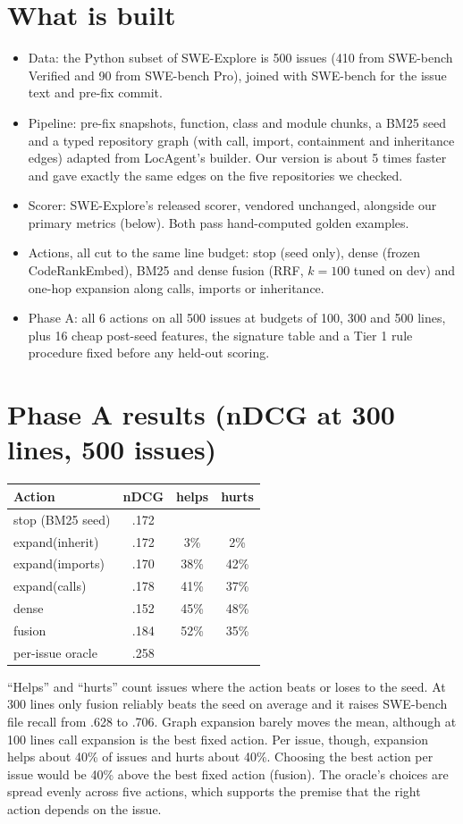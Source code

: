 \documentclass[10pt,a4paper,twocolumn]{article}
\begin{document}
\section{What is built}
\begin{itemize}
\item Data: the Python subset of SWE-Explore is 500 issues (410 from
SWE-bench Verified and 90 from SWE-bench Pro), joined with SWE-bench for the
issue text and pre-fix commit.
\item Pipeline: pre-fix snapshots, function, class and module chunks, a BM25
seed and a typed repository graph (with call, import, containment and
inheritance edges) adapted from LocAgent's builder. Our version is about 5 times
faster and gave exactly the same edges on the five repositories we checked.
\item Scorer: SWE-Explore's released scorer, vendored unchanged, alongside our
primary metrics (below). Both pass hand-computed golden examples.
\item Actions, all cut to the same line budget: stop (seed only), dense
(frozen CodeRankEmbed), BM25 and dense fusion (RRF, $k=100$ tuned on dev) and
one-hop expansion along calls, imports or inheritance.
\item Phase A: all 6 actions on all 500 issues at budgets of 100, 300 and
500 lines, plus 16 cheap post-seed features, the signature table and a
Tier 1 rule procedure fixed before any held-out scoring.
\end{itemize}

\section{Phase A results (nDCG at 300 lines, 500 issues)}
\begin{center}\small
\begin{tabular}{lccc}
\toprule
Action & nDCG & helps & hurts \\
\midrule
stop (BM25 seed) & .172 & & \\
expand(inherit) & .172 & 3\% & 2\% \\
expand(imports) & .170 & 38\% & 42\% \\
expand(calls) & .178 & 41\% & 37\% \\
dense & .152 & 45\% & 48\% \\
fusion & .184 & 52\% & 35\% \\
per-issue oracle & .258 & & \\
\bottomrule
\end{tabular}\end{center}
``Helps'' and ``hurts'' count issues where the action beats or loses to the
seed. At 300 lines only fusion reliably beats the seed on average and it
raises SWE-bench file recall from .628 to .706. Graph expansion barely moves
the mean, although at 100 lines call expansion is the best fixed action. Per issue, though, expansion helps about 40\% of issues and hurts
about 40\%. Choosing the best action per issue would be 40\% above the best
fixed action (fusion). The oracle's choices are spread evenly across five
actions, which supports the premise that the right action depends on the
issue.
\end{document}
